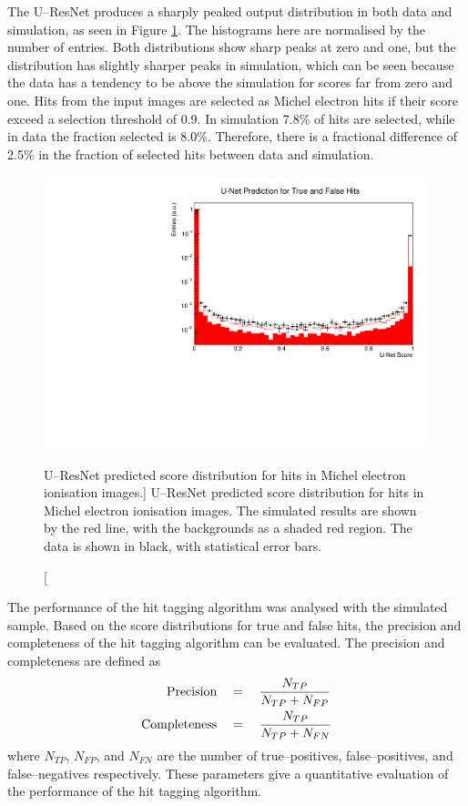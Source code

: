 The U--ResNet produces a sharply peaked output distribution in both data and
simulation, as seen in Figure \ref{fig:unet_pred_data}. The histograms here are
normalised by the number of entries. Both distributions show sharp peaks at zero
and one, but the distribution has slightly sharper peaks in simulation, which
can be seen because the data has a tendency to be above the simulation for
scores far from zero and one. Hits from the input images are selected as
Michel electron hits if their score exceed a selection threshold of 0.9. In
simulation 7.8\% of hits are selected, while in data the fraction selected is
8.0\%. Therefore, there is a fractional difference of 2.5\% in the fraction of
selected hits between data and simulation.
\begin{figure}
	\centering
	\includegraphics[width=\textwidth]{figures/unet_pred_data.pdf}
	\caption
	[U--ResNet predicted score distribution for hits in Michel electron ionisation
	images.]
	{U--ResNet predicted score distribution for hits in Michel electron
	ionisation images. The simulated results are shown by the red line, with the
	backgrounds as a shaded red region. The data is shown in black, with
	statistical error bars.}
	\label{fig:unet_pred_data}
\end{figure}

The performance of the hit tagging algorithm was analysed with the simulated
sample. Based on the score distributions for true and false hits, the precision
and completeness of the hit tagging algorithm can be evaluated. The precision
and completeness are defined as
\begin{align*}
	\mbox{Precision} \quad &= \quad  \frac{N_{TP}}{N_{TP} + N_{FP}} \\
	\vspace{2mm}
	\mbox{Completeness} \quad &= \quad \frac{N_{TP}}{N_{TP} + N_{FN}}
\end{align*}
where $N_{TP}$, $N_{FP}$, and $N_{FN}$ are the number of true--positives,
false--positives, and false--negatives respectively. These parameters give a
quantitative evaluation of the performance of the hit tagging algorithm.

